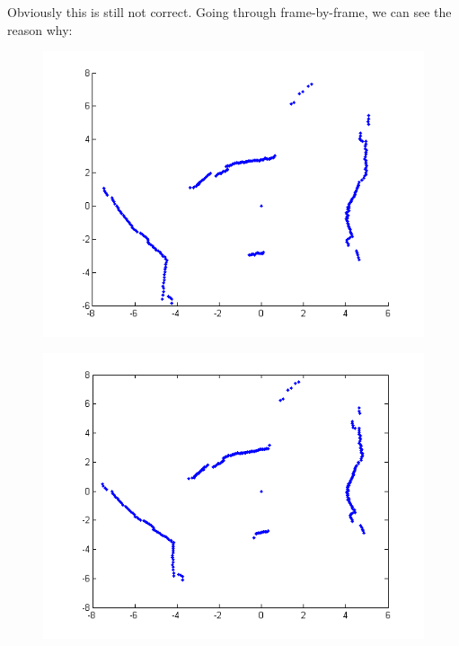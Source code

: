 {		Obviously this is still not correct. Going through frame-by-frame, we can see the reason why:
		
		\pagebreak
		\begin{figure}[position = here]
			\begin{centering}
				\includegraphics[scale=1]{./images/q2/wall_1_attempt2.png}\\
				\caption[\textit{RPYAxes}]{}
			\end{centering}
		\end{figure}
		\newline
		\pagebreak
		
		\begin{figure}[position = here]
			\begin{centering}
				\includegraphics[scale=1]{./images/q2/wall_2_attempt2.png}\\
				\caption[\textit{RPYAxes}]{}
			\end{centering}
		\end{figure}
		\newline
		\pagebreak
		
}
